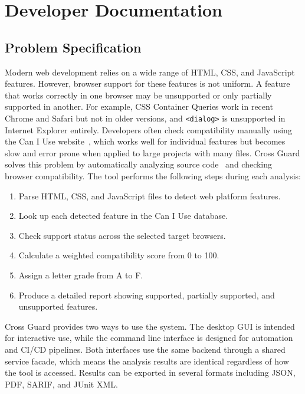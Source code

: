 \chapter{Developer Documentation}
\label{ch:impl}

\section{Problem Specification}
\label{sec:problem-spec}

Modern web development relies on a wide range of HTML, CSS, and JavaScript features. However, browser support for these features is not uniform. A feature that works correctly in one browser may be unsupported or only partially supported in another. For example, CSS Container Queries work in recent Chrome and Safari but not in older versions, and \texttt{<dialog>} is unsupported in Internet Explorer entirely. Developers often check compatibility manually using the Can I Use website~\cite{caniuse}, which works well for individual features but becomes slow and error prone when applied to large projects with many files. Cross Guard solves this problem by automatically analyzing source code~\cite{binkley2007sca} and checking browser compatibility. The tool performs the following steps during each analysis:

\begin{enumerate}
    \item Parse HTML, CSS, and JavaScript files to detect web platform features.
    \item Look up each detected feature in the Can I Use database.
    \item Check support status across the selected target browsers.
    \item Calculate a weighted compatibility score from 0 to 100.
    \item Assign a letter grade from A to F.
    \item Produce a detailed report showing supported, partially supported, and unsupported features.
\end{enumerate}

Cross Guard provides two ways to use the system. The desktop GUI is intended for interactive use, while the command line interface is designed for automation and CI/CD pipelines. Both interfaces use the same backend through a shared service facade, which means the analysis results are identical regardless of how the tool is accessed. Results can be exported in several formats including JSON, PDF, SARIF, and JUnit XML.

